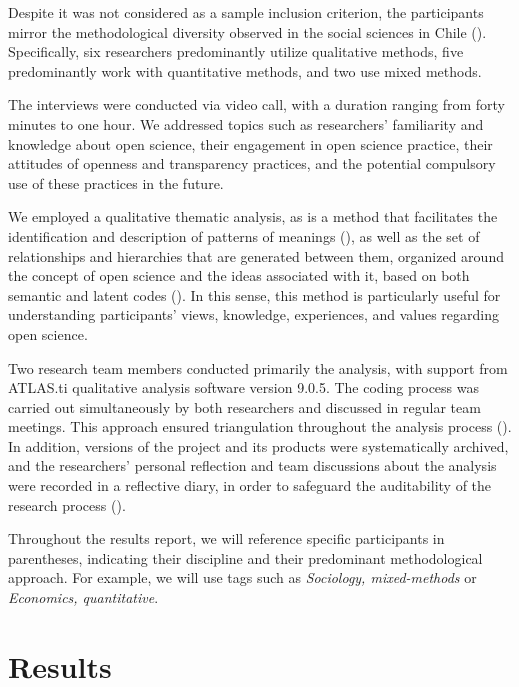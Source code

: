 \documentclass[
  letterpaper,
]{article}
\begin{document}
Despite it was not considered as a sample inclusion criterion, the
participants mirror the methodological diversity observed in the social
sciences in Chile (). Specifically, six researchers predominantly utilize
qualitative methods, five predominantly work with quantitative methods,
and two use mixed methods.

The interviews were conducted via video call, with a duration ranging
from forty minutes to one hour. We addressed topics such as researchers'
familiarity and knowledge about open science, their engagement in open
science practice, their attitudes of openness and transparency
practices, and the potential compulsory use of these practices in the
future.

We employed a qualitative thematic analysis, as is a method that
facilitates the identification and description of patterns of meanings
(), as well as the
set of relationships and hierarchies that are generated between them,
organized around the concept of open science and the ideas associated
with it, based on both semantic and latent codes
(). In this
sense, this method is particularly useful for understanding
participants' views, knowledge, experiences, and values regarding open
science.

Two research team members conducted primarily the analysis, with support
from ATLAS.ti qualitative analysis software version 9.0.5. The coding
process was carried out simultaneously by both researchers and discussed
in regular team meetings. This approach ensured triangulation throughout
the analysis process (). In addition, versions of the project and its products were
systematically archived, and the researchers' personal reflection and
team discussions about the analysis were recorded in a reflective diary,
in order to safeguard the auditability of the research process
().

Throughout the results report, we will reference specific participants
in parentheses, indicating their discipline and their predominant
methodological approach. For example, we will use tags such as
\emph{Sociology, mixed-methods} or \emph{Economics, quantitative}.

\section{Results}\label{results}
\end{document}

